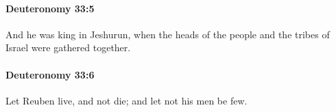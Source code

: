 		\paragraph{Deuteronomy 33:5} %
			\label{DEUTERONOMY-33-5}

			And he was king in Jeshurun, when the heads of the people and the tribes of Israel were gathered together.


		\paragraph{Deuteronomy 33:6} %
			\label{DEUTERONOMY-33-6}

			Let Reuben live, and not die; and let not his men be few.


